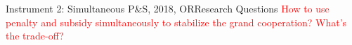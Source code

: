 \documentclass[14pt]{beamer}
\begin{document}

\begin{frame}{Instrument 2: Simultaneous P\&S, {\footnotesize 2018, OR}}{Research Questions}
\justifying
\textcolor{red}{How to use penalty and subsidy simultaneously to stabilize the grand cooperation? What's the trade-off?}\\
\begin{figure}
\end{figure}
\end{frame}
\end{document}
